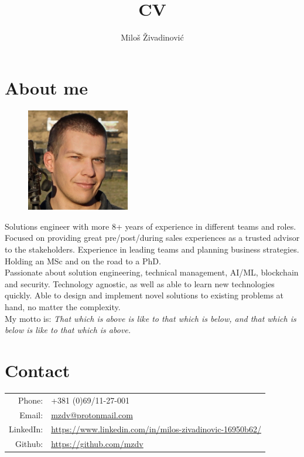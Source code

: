\documentclass[a4paper]{article}
\title{CV}
\author{Miloš Živadinović}
\date{}
\begin{document}
\maketitle

\section{About me}
\begin{figure}
    \vspace{-1.3em}
    \includegraphics[width=0.4\textwidth]{cv.jpg}
\end{figure}

Solutions engineer with more 8+ years of experience in different
teams and roles. Focused on providing great pre/post/during sales experiences as
a trusted advisor to the stakeholders. Experience in leading teams and planning
business strategies. Holding an MSc and on the road to a PhD. \\

\noindent Passionate about solution engineering, technical management, AI/ML,
blockchain and security. Technology agnostic, as well as
able to learn new technologies quickly. Able to design and implement novel solutions to
existing problems at hand, no matter the complexity. \\

\noindent My motto is: \emph{That which is above is like to that which is below,
    and that which is below is like to that which is above.}

\section{Contact}
\begin{tabular}{@{}r | l}
    Phone:    & +381 (0)69/11-27-001                                                                                                    \\
    Email:    & \href{mailto:mzdv@protonmail.com}{mzdv@protonmail.com}                                                                  \\
    LinkedIn: & \href{https://www.linkedin.com/in/milos-zivadinovic-16950b62/}{https://www.linkedin.com/in/milos-zivadinovic-16950b62/} \\
    Github:   & \href{https://github.com/mzdv}{https://github.com/mzdv}
\end{tabular}
\end{document}

